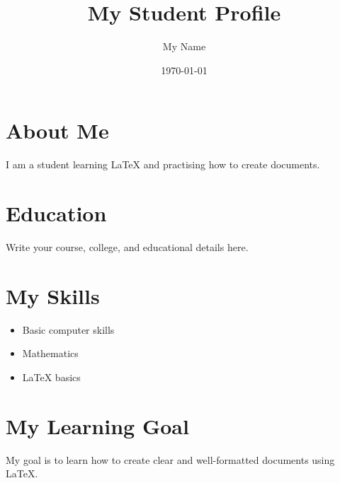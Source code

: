 \documentclass[12pt,a4paper]{article}
\title{My Student Profile}
\author{My Name}
\date{\today}
\begin{document}
\maketitle

\section{About Me}
I am a student learning LaTeX and practising how to create documents.

\section{Education}
Write your course, college, and educational details here.

\section{My Skills}
\begin{itemize}
    \item Basic computer skills
    \item Mathematics
    \item LaTeX basics
\end{itemize}

\section{My Learning Goal}
My goal is to learn how to create clear and well-formatted documents using LaTeX.
\end{document}
